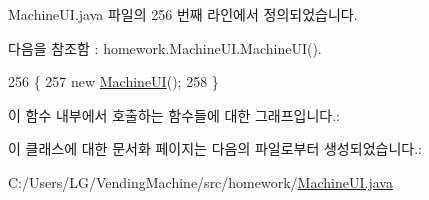 Machine\+U\+I.\+java 파일의 256 번째 라인에서 정의되었습니다.



다음을 참조함 \+:  homework.\+Machine\+U\+I.\+Machine\+U\+I().


\begin{DoxyCode}
256                                             \{
257         \textcolor{keyword}{new} \hyperlink{classhomework_1_1_machine_u_i_a0e2b7895984cb257668698ac745b4dc3}{MachineUI}();   
258     \}
\end{DoxyCode}


이 함수 내부에서 호출하는 함수들에 대한 그래프입니다.\+:




이 클래스에 대한 문서화 페이지는 다음의 파일로부터 생성되었습니다.\+:\begin{DoxyCompactItemize}
\item 
C\+:/\+Users/\+L\+G/\+Vending\+Machine/src/homework/\hyperlink{_machine_u_i_8java}{Machine\+U\+I.\+java}\end{DoxyCompactItemize}
